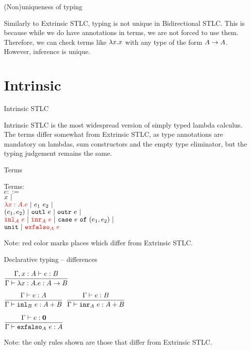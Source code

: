 \documentclass{beamer}
\begin{document}
\begin{frame}{(Non)uniqueness of typing}

Similarly to Extrinsic STLC, typing is not unique in Bidirectional STLC. This is because while we do have annotations in terms, we are not forced to use them. Therefore, we can check terms like $\lambda x. x$ with any type of the form $A \to A$. However, inference is unique.

\end{frame}

\section{Intrinsic}


\begin{frame}{Intrinsic STLC}

Intrinsic STLC is the most widespread version of simply typed lambda calculus. The terms differ somewhat from Extrinsic STLC, as type annotations are mandatory on lambdas, sum constructors and the empty type eliminator, but the typing judgement remains the same.

\end{frame}

\begin{frame}{Terms}

Terms: \\
$e ::=$ \\
\qquad $x \ |\ $ \\
\qquad $\termdiff{\ifun{x}{A}{e}} \pipe \app{e_1}{e_2} \pipe$ \\
\qquad $(e_1, e_2) \ |\  \texttt{outl}\ e \ |\  \texttt{outr}\ e \ |\ $ \\
\qquad $\termdiff{\iinl{A}{e}} \pipe \termdiff{\iinr{A}{e}} \pipe \case{e}{e_1}{e_2} \pipe$ \\
\qquad $\unit \pipe \termdiff{\iexfalso{A}{e}}$

\vspace{2em}

Note: red color marks places which differ from Extrinsic STLC.

\end{frame}

\begin{frame}{Declarative typing -- differences}

\begin{center}
  $\displaystyle \frac{\Gamma, x : A \vdash e : B}{\Gamma \vdash \lambda x : A. e : A \to B} \textsc{\footnotesize{}}$

  \vspace{2em}

  $\displaystyle \frac{\Gamma \vdash e : A}{\Gamma \vdash \texttt{inl}_{B}\ e : A + B} \textsc{\footnotesize{}}$ \quad
  $\displaystyle \frac{\Gamma \vdash e : B}{\Gamma \vdash \texttt{inr}_{A}\ e : A + B} \textsc{\footnotesize{}}$

  \vspace{2em}

  $\displaystyle \frac{\Gamma \vdash e : \textbf{0}}{\Gamma \vdash \texttt{exfalso}_{A}\ e : A} \textsc{\footnotesize{}}$
\end{center}

\vspace{2em}

Note: the only rules shown are those that differ from Extrinsic STLC.

\end{frame}
\end{document}
